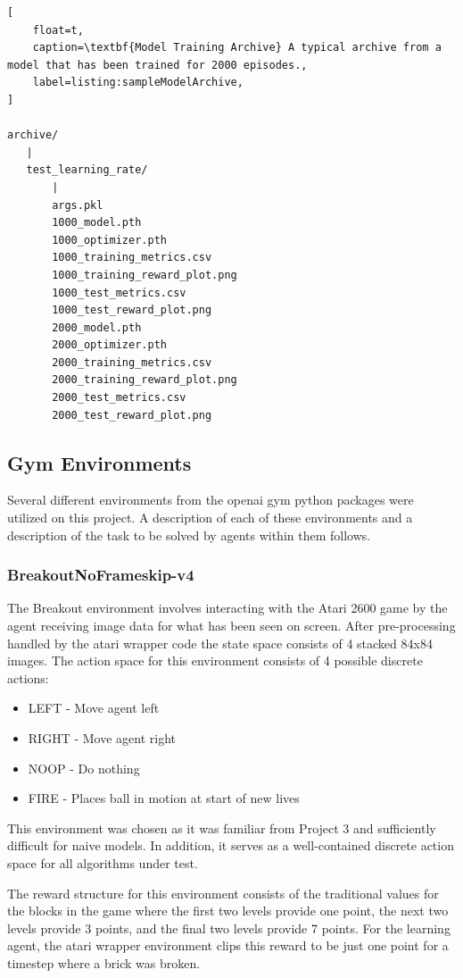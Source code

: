 \documentclass[conference]{IEEEtran}
\begin{document}
\begin{lstlisting}[
    float=t,
    caption=\textbf{Model Training Archive} A typical archive from a model that has been trained for 2000 episodes.,
    label=listing:sampleModelArchive,
]

archive/
   |
   test_learning_rate/
       |
       args.pkl
       1000_model.pth
       1000_optimizer.pth
       1000_training_metrics.csv
       1000_training_reward_plot.png
       1000_test_metrics.csv
       1000_test_reward_plot.png
       2000_model.pth
       2000_optimizer.pth
       2000_training_metrics.csv
       2000_training_reward_plot.png
       2000_test_metrics.csv
       2000_test_reward_plot.png
\end{lstlisting}

\subsection{Gym Environments}
Several different environments from the openai gym python packages were utilized on this project.
A description of each of these environments and a description of the task to be solved by agents within them follows.

\subsubsection{BreakoutNoFrameskip-v4}
The Breakout environment involves interacting with the Atari 2600 game by the agent receiving image data for what has been seen on screen.
After pre-processing handled by the atari wrapper code the state space consists of 4 stacked 84x84 images.
The action space for this environment consists of 4 possible discrete actions:

\begin{itemize}
    \item LEFT - Move agent left
    \item RIGHT - Move agent right
    \item NOOP - Do nothing
    \item FIRE - Places ball in motion at start of new lives
\end{itemize}

This environment was chosen as it was familiar from Project 3 and sufficiently difficult for naive models.
In addition, it serves as a well-contained discrete action space for all algorithms under test.

The reward structure for this environment consists of the traditional values for the blocks in the game where the first two levels provide one point, the next two levels provide 3 points, and the final two levels provide 7 points.
For the learning agent, the atari wrapper environment clips this reward to be just one point for a timestep where a brick was broken.
\end{document}
